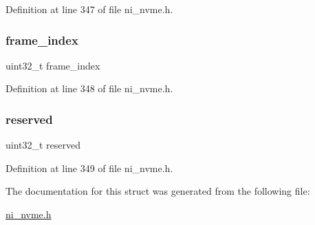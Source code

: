 Definition at line 347 of file ni\+\_\+nvme.\+h.

\mbox{\label{struct__ni__nvme__write__complete__dw0__t_a05f60adb7ca73495905c236f23d474d6}} 
\subsubsection{\texorpdfstring{frame\_index}{frame\_index}}
{\footnotesize\ttfamily uint32\+\_\+t frame\+\_\+index}



Definition at line 348 of file ni\+\_\+nvme.\+h.

\mbox{\label{struct__ni__nvme__write__complete__dw0__t_aa43c4c21b173ada1b6b7568956f0d650}} 
\subsubsection{\texorpdfstring{reserved}{reserved}}
{\footnotesize\ttfamily uint32\+\_\+t reserved}



Definition at line 349 of file ni\+\_\+nvme.\+h.



The documentation for this struct was generated from the following file\+:\begin{DoxyCompactItemize}
\item 
\mbox{\hyperlink{ni__nvme_8h}{ni\+\_\+nvme.\+h}}\end{DoxyCompactItemize}
